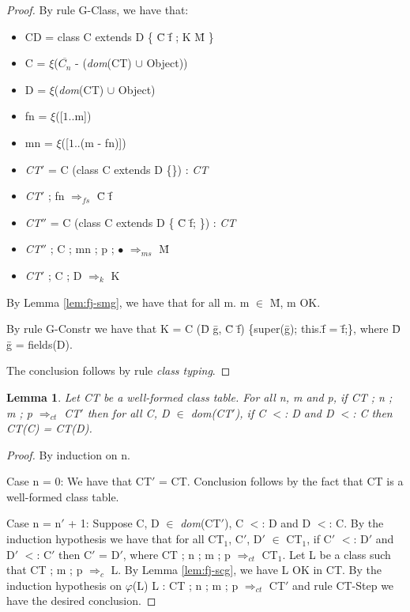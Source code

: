 \documentclass[tese,capa,english]{texufpel}
\newtheorem{lemma}{Lemma}
\begin{document}
\begin{proof}
By rule {\footnotesize G-Class}, we have that:

\begin{itemize}
\item CD = class C extends D \{ \={C} \={f} ; K \={M} \}
\item C = $\xi$($\overline{C_n}$ - (\emph{dom}(CT) $\cup$ Object))
\item D = $\xi$(\emph{dom}(CT) $\cup$ Object)
\item fn = $\xi$([$1..$m])
\item mn = $\xi$([$1..$(m - fn)])
\item \emph{CT}$'$ = C (class C extends D \{\}) : \emph{CT} 
\item \emph{CT}$'$ ; fn $\Rightarrow_{fs}$ \={C} \={f}
\item \emph{CT}$''$ = C (class C extends D \{ \={C} \={f}; \}) : \emph{CT}
\item \emph{CT}$''$ ; C ; mn ; p ; $\bullet$ $\Rightarrow_{ms}$ \={M}
\item \emph{CT}$'$ ; C ; D $\Rightarrow_k$ K
\end{itemize}

By Lemma \ref{lem:fj-smg}, we have that for all m. m $\in$ \={M}, m OK.

By rule {\footnotesize G-Constr} we have that K =  C (\={D} \={g}, \={C} \={f}) \{super(\={g}); this.\={f} = \={f};\}, where \={D} \={g} = fields(D).

The conclusion follows by rule \emph{class typing}.
\end{proof}

\begin{lemma}
\label{lem:fj-ctst}
Let \emph{CT} be a well-formed class table. For all n, m and p, if \emph{CT} ; n ; m ; p $\Rightarrow_{ct}$ \emph{CT}$'$ then for all C, D $\in$ dom\emph{(CT$'$)}, if C $<$: D and D $<$: C  then \emph{CT(C)} = \emph{CT(D)}.
\end{lemma}

\begin{proof}
By induction on n.

\vspace{5pt}

Case n = 0: We have that CT$'$ = CT. Conclusion follows by the fact that CT is a well-formed class table.

\vspace{5pt}

Case n = n$'$ + 1: Suppose C, D $\in$ \emph{dom}(CT$'$), C $<$: D and D $<$: C. By the induction hypothesis we have that for all CT$_1$, C$'$, D$'$ $\in$ CT$_1$, if C$'$ $<$: D$'$ and D$'$ $<$: C$'$ then C$'$ = D$'$, where CT ; n ; m ; p $\Rightarrow_{ct}$ CT$_1$. Let L be
a class such that CT ; m ; p $\Rightarrow_c$ L. By Lemma \ref{lem:fj-scg}, we have L OK in CT. By
the induction hypothesis on $\varphi$(L) L : CT ; n ; m ; p $\Rightarrow_{ct}$ CT$'$ and
rule {\footnotesize CT-Step} we have the desired conclusion.
\end{proof}
\end{document}
